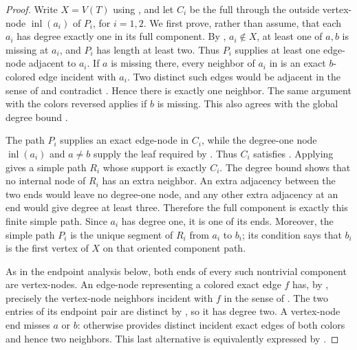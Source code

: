 \begin{proof}
Write $X=V(T)$ using , and let $C_i$ be
the full  through the outside vertex-node
$\operatorname{inl}(a_i)$ of $P_i$, for $i=1,2$.  We first prove, rather
than assume, that each $a_i$ has degree exactly one in its full component.
By , $a_i\notin X$, at least one of $a,b$ is missing
at $a_i$, and $P_i$ has length at least two.  Thus $P_i$ supplies at least
one edge-node adjacent to $a_i$.  If $a$ is missing there, every neighbor
of $a_i$ in  is an exact $b$-colored edge
incident with $a_i$.  Two distinct such edges would be adjacent in the
sense of  and contradict
.  Hence there is exactly one neighbor.  The
same argument with the colors reversed applies if $b$ is missing.  This
also agrees with the global degree bound
.

The path $P_i$ supplies an exact edge-node in $C_i$, while the degree-one
node $\operatorname{inl}(a_i)$ and $a\ne b$ supply the leaf required by
.  Thus $C_i$ satisfies
.  Applying
 gives a simple path $R_i$ whose
support is exactly $C_i$.  The degree bound shows that no internal node of
$R_i$ has an extra neighbor.  An extra adjacency between the two ends
would leave no degree-one node, and any other extra adjacency at an end
would give degree at least three.  Therefore the full component is exactly
this finite simple path.  Since $a_i$ has degree one, it is one of its
ends.  Moreover, the simple path $P_i$ is the unique segment of $R_i$ from
$a_i$ to $b_i$; its  condition says that $b_i$ is
the first vertex of $X$ on that oriented component path.

As in the endpoint analysis below, both ends of every such nontrivial
component are vertex-nodes.  An edge-node representing a colored exact
edge $f$ has, by , precisely the
vertex-node neighbors incident with $f$ in the sense of
.  The two entries of its endpoint pair are distinct by
, so it has degree two.  A vertex-node end
misses $a$ or $b$: otherwise  provides distinct
incident exact edges of both colors and hence two neighbors.  This last
alternative is equivalently expressed by .


\end{proof}
